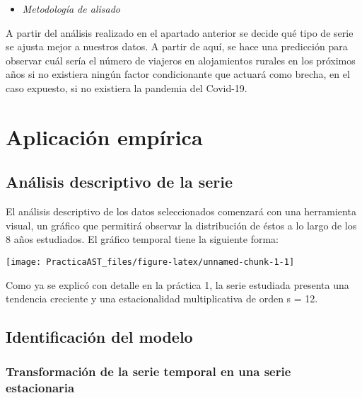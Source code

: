 \documentclass[
]{article}
\providecommand{\tightlist}{%
  \setlength{\itemsep}{0pt}\setlength{\parskip}{0pt}}
\begin{document}
\begin{itemize}
\tightlist
\item
  \emph{Metodología de alisado}
\end{itemize}

A partir del análisis realizado en el apartado anterior se decide qué
tipo de serie se ajusta mejor a nuestros datos. A partir de aquí, se
hace una predicción para observar cuál sería el número de viajeros en
alojamientos rurales en los próximos años si no existiera ningún factor
condicionante que actuará como brecha, en el caso expuesto, si no
existiera la pandemia del Covid-19.

\medskip

\hypertarget{aplicaciuxf3n-empuxedrica}{%
\section{Aplicación empírica}\label{aplicaciuxf3n-empuxedrica}}

\hypertarget{anuxe1lisis-descriptivo-de-la-serie}{%
\subsection{Análisis descriptivo de la
serie}\label{anuxe1lisis-descriptivo-de-la-serie}}

El análisis descriptivo de los datos seleccionados comenzará con una
herramienta visual, un gráfico que permitirá observar la distribución de
éstos a lo largo de los 8 años estudiados. El gráfico temporal tiene la
siguiente forma:

\begin{center}\texttt{[image: PracticaAST\_files/figure-latex/unnamed-chunk-1-1]} \end{center}

Como ya se explicó con detalle en la práctica 1, la serie estudiada
presenta una tendencia creciente y una estacionalidad multiplicativa de
orden s = 12.

\hypertarget{identificaciuxf3n-del-modelo}{%
\subsection{Identificación del
modelo}\label{identificaciuxf3n-del-modelo}}

\hypertarget{transformaciuxf3n-de-la-serie-temporal-en-una-serie-estacionaria}{%
\subsubsection{Transformación de la serie temporal en una serie
estacionaria}\label{transformaciuxf3n-de-la-serie-temporal-en-una-serie-estacionaria}}
\end{document}
